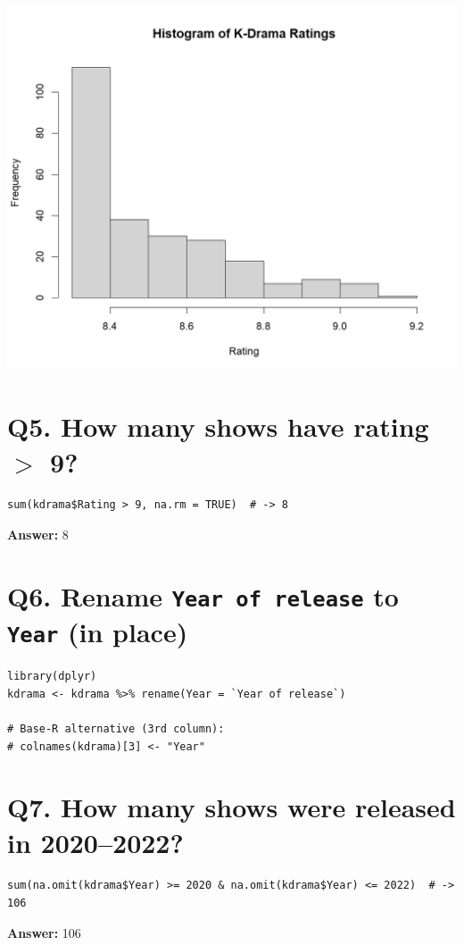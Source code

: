 \documentclass[11pt]{article}
\begin{document}
\begin{center}
\includegraphics[width=.8\linewidth]{histogram of Kdrama.png} 
\end{center}

\section*{Q5. How many shows have rating $>$ 9?}
\begin{lstlisting}
sum(kdrama$Rating > 9, na.rm = TRUE)  # -> 8
\end{lstlisting}
\textbf{Answer:} 8

\section*{Q6. Rename \texttt{Year of release} to \texttt{Year} (in place)}
\begin{lstlisting}
library(dplyr)
kdrama <- kdrama %>% rename(Year = `Year of release`)

# Base-R alternative (3rd column):
# colnames(kdrama)[3] <- "Year"
\end{lstlisting}

\section*{Q7. How many shows were released in 2020--2022?}
\begin{lstlisting}
sum(na.omit(kdrama$Year) >= 2020 & na.omit(kdrama$Year) <= 2022)  # -> 106
\end{lstlisting}
\textbf{Answer:} 106
\end{document}
